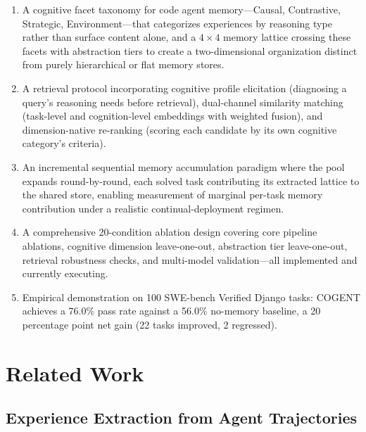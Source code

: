 \documentclass[letterpaper]{article} %
\begin{document}
\begin{enumerate}
    \item[(C1)] A cognitive facet taxonomy for code agent memory---Causal, Contrastive, Strategic, Environment---that categorizes experiences by reasoning type rather than surface content alone, and a $4 \times 4$ memory lattice crossing these facets with abstraction tiers to create a two-dimensional organization distinct from purely hierarchical or flat memory stores.
    \item[(C2)] A retrieval protocol incorporating cognitive profile elicitation (diagnosing a query's reasoning needs before retrieval), dual-channel similarity matching (task-level and cognition-level embeddings with weighted fusion), and dimension-native re-ranking (scoring each candidate by its own cognitive category's criteria).
    \item[(C3)] An incremental sequential memory accumulation paradigm where the pool expands round-by-round, each solved task contributing its extracted lattice to the shared store, enabling measurement of marginal per-task memory contribution under a realistic continual-deployment regimen.
    \item[(C4)] A comprehensive 20-condition ablation design covering core pipeline ablations, cognitive dimension leave-one-out, abstraction tier leave-one-out, retrieval robustness checks, and multi-model validation---all implemented and currently executing.
    \item[(C5)] Empirical demonstration on 100 SWE-bench Verified Django tasks: \textsc{COGENT} achieves a 76.0\% pass rate against a 56.0\% no-memory baseline, a 20 percentage point net gain (22 tasks improved, 2 regressed).
\end{enumerate}

\section{Related Work}

\subsection{Experience Extraction from Agent Trajectories}
\end{document}
